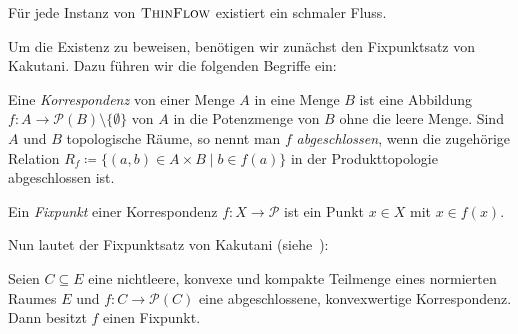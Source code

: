 \begin{theorem}\label{thm-existence-thin-flow}
	Für jede Instanz von $\textsc{ThinFlow}$ existiert ein schmaler Fluss.
\end{theorem}

Um die Existenz zu beweisen, benötigen wir zunächst den Fixpunktsatz von Kakutani.
Dazu führen wir die folgenden Begriffe ein:

\begin{definition}
	Eine \emph{Korrespondenz} von einer Menge $A$ in eine Menge $B$ ist eine Abbildung $f: A \to \mathcal{P}(B)\setminus \{ \emptyset \}$ von $A$ in die Potenzmenge von $B$ ohne die leere Menge.
	Sind $A$ und $B$ topologische Räume, so nennt man $f$ \emph{abgeschlossen}, wenn die zugehörige Relation $R_f \coloneq \{ (a,b) \in A\times B \mid b\in f(a) \}$ in der Produkttopologie abgeschlossen ist.

	Ein \emph{Fixpunkt} einer Korrespondenz $f: X \to \mathcal{P}$ ist ein Punkt $x\in X$ mit $x\in f(x)$.
\end{definition}

Nun lautet der Fixpunktsatz von Kakutani (siehe~\cite{Heuser1991Fix}):

\begin{satz}\label{satz-kakutani}
	Seien $C\subseteq E$ eine nichtleere, konvexe und kompakte Teilmenge eines normierten Raumes $E$ und $f: C \to \mathcal{P}(C)$ eine abgeschlossene, konvexwertige Korrespondenz.
	Dann besitzt $f$ einen Fixpunkt.
\end{satz}

